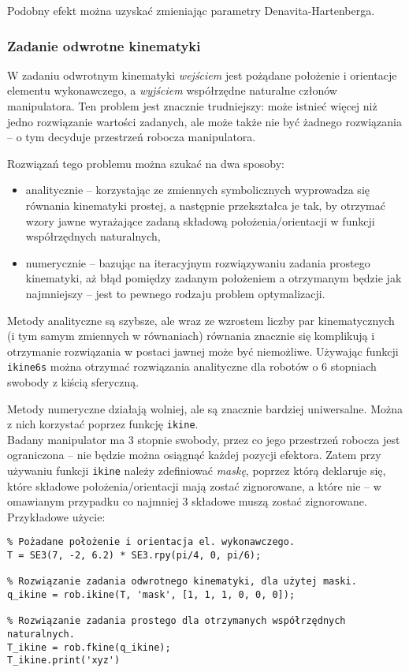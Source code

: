 \documentclass[11pt, a4paper]{article}
\begin{document}
Podobny efekt można uzyskać zmieniając parametry Denavita-Hartenberga.

\subsubsection*{Zadanie odwrotne kinematyki}

W zadaniu odwrotnym kinematyki \emph{wejściem} jest pożądane położenie i orientacje elementu wykonawczego, a \emph{wyjściem} współrzędne naturalne członów manipulatora. Ten problem jest znacznie trudniejszy: może istnieć więcej niż jedno rozwiązanie wartości zadanych, ale może także nie być żadnego rozwiązania -- o tym decyduje przestrzeń robocza manipulatora.

Rozwiązań tego problemu można szukać na dwa sposoby:
\begin{itemize}
\item analitycznie -- korzystając ze zmiennych symbolicznych wyprowadza się równania kinematyki prostej, a następnie przekształca je tak, by otrzymać wzory jawne wyrażające zadaną składową położenia/orientacji w funkcji współrzędnych naturalnych,
\item numerycznie -- bazując na iteracyjnym rozwiązywaniu zadania prostego kinematyki, aż błąd pomiędzy zadanym położeniem a otrzymanym będzie jak najmniejszy -- jest to pewnego rodzaju problem optymalizacji.
\end{itemize}

Metody analityczne są szybsze, ale wraz ze wzrostem liczby par kinematycznych (i tym samym zmiennych w równaniach) równania znacznie się komplikują i otrzymanie rozwiązania w postaci jawnej może być niemożliwe. Używając funkcji \texttt{ikine6s} można otrzymać rozwiązania analityczne dla robotów o 6 stopniach swobody z kiścią sferyczną.

Metody numeryczne działają wolniej, ale są znacznie bardziej uniwersalne. Można z nich korzystać poprzez funkcję \texttt{ikine}.\\

Badany manipulator ma 3 stopnie swobody, przez co jego przestrzeń robocza jest ograniczona -- nie będzie można osiągnąć każdej pozycji efektora. Zatem przy używaniu funkcji \texttt{ikine} należy zdefiniować \emph{maskę}, poprzez którą deklaruje się, które składowe położenia/orientacji mają zostać zignorowane, a które nie -- w omawianym przypadku co najmniej 3 składowe muszą zostać zignorowane. Przykładowe użycie:
\begin{lstlisting}
% Pożadane położenie i orientacja el. wykonawczego.
T = SE3(7, -2, 6.2) * SE3.rpy(pi/4, 0, pi/6);

% Rozwiązanie zadania odwrotnego kinematyki, dla użytej maski.
q_ikine = rob.ikine(T, 'mask', [1, 1, 1, 0, 0, 0]);

% Rozwiązanie zadania prostego dla otrzymanych współrzędnych naturalnych.
T_ikine = rob.fkine(q_ikine);
T_ikine.print('xyz')
\end{lstlisting}
\end{document}
